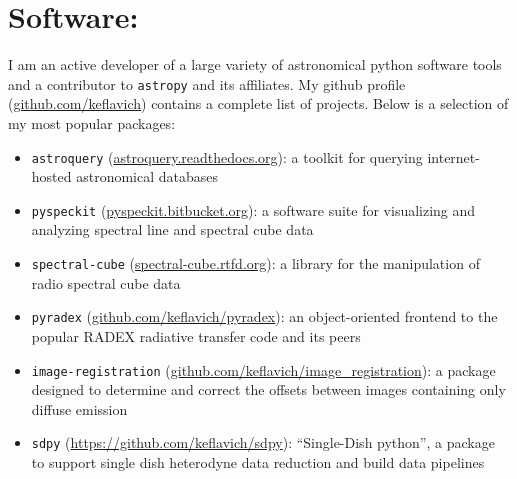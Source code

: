 \section*{Software:}
\vspace{-10pt}
I am an active developer of a large variety of astronomical python software
tools and a contributor to \texttt{astropy} and its affiliates.  My github
profile (\url{github.com/keflavich}) contains a complete list of projects.
Below is a selection of my most popular packages:
\vspace{-10pt}

\begin{itemize}
\itemsep-3pt
    \item \texttt{astroquery} (\url{astroquery.readthedocs.org}):
        a toolkit for querying internet-hosted astronomical databases
    \item \texttt{pyspeckit} (\url{pyspeckit.bitbucket.org}): a software suite
        for visualizing and analyzing spectral line and spectral cube
        data
    \item \texttt{spectral-cube} (\url{spectral-cube.rtfd.org}): a library for the manipulation
        of radio spectral cube data
    \item \texttt{pyradex} (\url{github.com/keflavich/pyradex}):
        an object-oriented frontend to the popular RADEX radiative transfer code and
        its peers
    \item \texttt{image-registration} (\url{github.com/keflavich/image_registration}):
        a package designed to determine and correct the offsets between images containing only
        diffuse emission
    \item \texttt{sdpy} (\url{https://github.com/keflavich/sdpy}):
        ``Single-Dish python'', a package to support single dish heterodyne data
        reduction and build data pipelines
\end{itemize}

